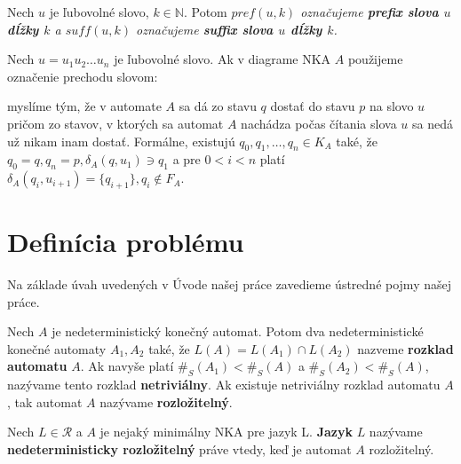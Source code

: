 \begin{notation}
Nech $ u $ je ľubovolné slovo, $ k \in \mathbb{N} $. Potom \em{}$ pref(u,k) $\em{} označujeme \textbf{prefix slova $ u $ dĺžky $ k $} a \em{}$ suff(u,k) $\em{} označujeme \textbf{suffix slova $ u $ dĺžky $ k $}.
\end{notation}

\begin{notation}
Nech $ u = u_1u_2 \ldots u_n$ je ľubovolné slovo. Ak v diagrame NKA $ A $ použijeme označenie prechodu slovom:
\begin{figure}[H]
\centering
{}
\end{figure}

myslíme tým, že v automate $ A $ sa dá zo stavu $ q $ dostať do stavu $ p $ na slovo $ u $ pričom zo stavov, v ktorých sa automat $ A $ nachádza počas čítania slova $ u $ sa nedá už nikam inam dostať. Formálne, existujú $ q_0, q_1, \ldots, q_n \in K_A $ také, že $ q_0 = q, q_n = p, \delta_A(q, u_1) \ni q_1 $ a pre $ 0 < i < n $ platí $ \delta_A(q_i,u_{i+1}) = \lbrace q_{i+1} \rbrace, q_i \notin F_A $.
\end{notation}

\section{Definícia problému}
Na základe úvah uvedených v Úvode našej práce zavedieme ústredné pojmy našej práce.

\begin{definition}
Nech $ A $ je nedeterministický konečný automat. Potom dva nedeterministické konečné automaty $ A_1, A_2 $ také, že $ L(A)=L(A_1) \cap L(A_2) $ nazveme \textbf{rozklad automatu} $ A $. Ak navyše platí $ \#_S(A_1) < \#_S(A)$ a $ \#_S(A_2) < \#_S(A) $, nazývame tento rozklad \textbf{netriviálny}. Ak existuje netriviálny rozklad automatu $ A $, tak automat $ A $ nazývame \textbf{rozložitelný}.
\end{definition}

\begin{definition}
\label{def:nedeterministic_decomposability_of_language}
Nech $ L \in \mathscr{R} $ a $ A $ je nejaký minimálny NKA pre jazyk L. \textbf{Jazyk} $ L $ nazývame \textbf{nedeterministicky rozložitelný} práve vtedy, keď je automat $ A $ rozložitelný.
\end{definition}

